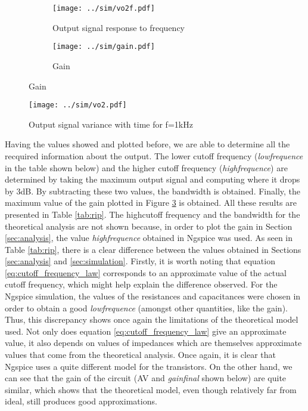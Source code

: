 \begin{figure}[H]
  \begin{subfigure}{.49\linewidth}
    \centering
    \texttt{[image: ../sim/vo2f.pdf]}
    \footnotesize
  \caption{Output signal response to frequency}
   \label{fig:out1}
  \end{subfigure}
  \hspace{5mm}
  \begin{subfigure}{.49\linewidth}
    \centering
  \texttt{[image: ../sim/gain.pdf]}
  \caption{Gain}
  \label{fig:out2}
  \end{subfigure}
\end{figure}

 \begin{figure}[H]
    \centering
  \texttt{[image: ../sim/vo2.pdf]}
  \caption{Output signal variance with time for f=1kHz}
  \label{fig:outtime}
 \end{figure}

 Having the values showed and plotted before, we are able to determine all the recquired information about the output. The lower cutoff frequency (\textit{lowfrequence} in the table shown below) and the higher cutoff frequency (\textit{highfrequence}) are determined by taking the maximum output signal and computing where it drops by 3dB. By subtracting these two values, the bandwidth is obtained. Finally, the  maximum value of the gain plotted in Figure \ref{fig:out2} is obtained. All these results are presented in Table \ref{tab:rip}. The highcutoff frequency and the bandwidth for the theoretical analysis are not shown because, in order to plot the gain in Section \ref{sec:analysis}, the value \textit{highfrequence} obtained in Ngspice was used. As seen in Table \ref{tab:rip}, there is a clear difference between the values obtained in Sections \ref{sec:analysis} and \ref{sec:simulation}. Firstly, it is worth noting that equation \ref{eq:cutoff_frequency_law} corresponds to an approximate value of the actual cutoff frequency, which might help explain the difference observed. For the Ngspice simulation, the values of the resistances and capacitances were chosen in order to obtain a good \textit{lowfrequence} (amongst other quantities, like the gain). Thus, this discrepancy shows once again the limitations of the theoretical model used. Not only does equation \ref{eq:cutoff_frequency_law} give an approximate value, it also depends on values of impedances which are themselves approximate values that come from the theoretical analysis. Once again, it is clear that Ngspice uses a quite different model for the transistors. On the other hand, we can see that the gain of the circuit (AV and \textit{gainfinal} shown below) are quite similar, which shows that the theoretical model, even though relatively far from ideal, still produces good approximations.

